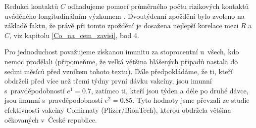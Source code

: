 Redukci kontaktů $C$ odhadujeme pomocí průměrného počtu rizikových
kontaktů uváděného longitudinálním výzkumem \cite{paqcovid}. Dvoutýdenní zpoždění bylo zvoleno na základě faktu, že právě při tomto zpoždění je dosažena nejlepší korelace mezi $R$ a $C$, viz kapitolu \ref{Co_na_cem_zavisi}, bod 4. 

Pro jednoduchost považujeme získanou imunitu za stoprocentní u~všech,
kdo nemoc prodělali (připomeňme, že velká většina hlášených případů
nastala do sedmi měsíců před vznikem tohoto textu). Dále předpokládáme,
že ti, kteří obdrželi před více než třemi týdny první dávku vakcíny,
jsou imunní s~pravděpodobností $e^{1}=0.7$, zatímco ti, kteří jsou
týden a déle po druhé dávce, jsou imunní s~pravděpodobností $e^{2}=0.85$.
Tyto hodnoty jsme převzali ze studie \cite{Hall_etal2021} efektivnosti
vakcíny Comirnaty (Pfizer/BionTech), kterou obdržela většina očkovaných
v~České republice. 

